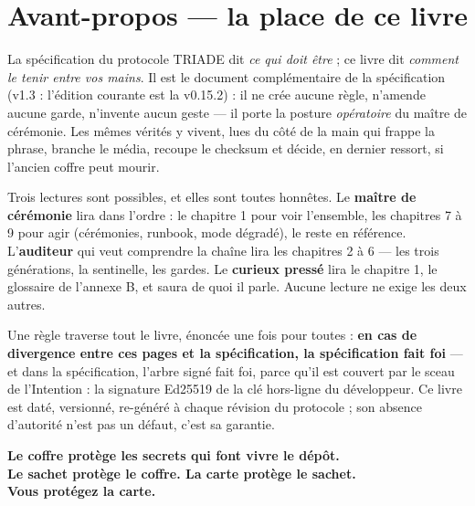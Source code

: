 \section*{Avant-propos — la place de ce livre}\label{sec:avantpropos}


La spécification du protocole TRIADE dit \emph{ce qui doit être} ; ce livre dit
\emph{comment le tenir entre vos mains}. Il est le document complémentaire de la
spécification (v1.3 : l'édition courante est la v0.15.2) : il ne crée aucune règle,
n'amende aucune garde, n'invente aucun geste
— il porte la posture \emph{opératoire} du maître de cérémonie. Les mêmes vérités y
vivent, lues du côté de la main qui frappe la phrase, branche le média, recoupe le
checksum et décide, en dernier ressort, si l'ancien coffre peut mourir.

Trois lectures sont possibles, et elles sont toutes honnêtes. Le \textbf{maître de
cérémonie} lira dans l'ordre : le chapitre 1 pour voir l'ensemble, les chapitres 7 à 9
pour agir (cérémonies, runbook, mode dégradé), le reste en référence. L'\textbf{auditeur}
qui veut comprendre la chaîne lira les chapitres 2 à 6 — les trois générations, la
sentinelle, les gardes. Le \textbf{curieux pressé} lira le chapitre 1, le glossaire de
l'annexe B, et saura de quoi il parle. Aucune lecture ne exige les deux autres.

Une règle traverse tout le livre, énoncée une fois pour toutes : \textbf{en cas de
divergence entre ces pages et la spécification, la spécification fait foi} — et dans la
spécification, l'arbre signé  fait foi, parce qu'il est couvert par le
sceau de l'Intention : la signature Ed25519 de la clé hors-ligne du développeur. Ce
livre est daté, versionné, re-généré à chaque révision du protocole ; son absence
d'autorité n'est pas un défaut, c'est sa garantie.

\bigskip

\begin{center}
\large\bfseries Le coffre protège les secrets qui font vivre le dépôt.\\
Le sachet protège le coffre. La carte protège le sachet.\\
Vous protégez la carte.
\end{center}

